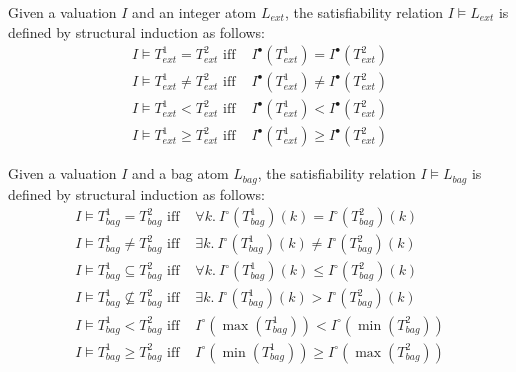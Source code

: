Given a valuation $I$ and an integer atom $L_{ext}$, the satisfiability relation $I \models L_{ext}$ is defined by structural induction as follows:
\begin{align*}
I \models T^1_{ext}=T^2_{ext} \mbox{ iff }& I^{\bullet}(T^1_{ext}) = I^{\bullet}(T^2_{ext}) \\
I \models T^1_{ext}\ne T^2_{ext} \mbox{ iff }& I^{\bullet}(T^1_{ext}) \ne I^{\bullet}(T^2_{ext}) \\
I \models T^1_{ext} < T^2_{ext} \mbox{ iff }& I^{\bullet}(T^1_{ext}) < I^{\bullet}(T^2_{ext}) \\
I \models T^1_{ext}\ge T^2_{ext} \mbox{ iff }& I^{\bullet}(T^1_{ext}) \ge I^{\bullet}(T^2_{ext})
\end{align*}

Given a valuation $I$ and a bag atom $L_{bag}$, the satisfiability relation $I \models L_{bag}$ is defined by structural induction as follows:
\begin{align*}
I \models T^1_{bag} = T^2_{bag} \mbox{ iff }& \forall k.~I^\circ(T^1_{bag})(k) = I^\circ(T^2_{bag})(k) \\
I \models T^1_{bag} \neq T^2_{bag} \mbox{ iff }& \exists k.~I^\circ(T^1_{bag})(k) \neq I^\circ(T^2_{bag})(k) \\
I \models T^1_{bag} \subseteq T^2_{bag} \mbox{ iff }& \forall k.~I^\circ(T^1_{bag})(k) \leq I^\circ(T^2_{bag})(k) \\
I \models T^1_{bag} \nsubseteq T^2_{bag} \mbox{ iff }& \exists k.~I^\circ(T^1_{bag})(k) > I^\circ(T^2_{bag})(k) \\
I \models T^1_{bag} < T^2_{bag} \mbox{ iff }& I^\circ(\max(T^1_{bag})) < I^\circ(\min(T^2_{bag})) \\
I \models T^1_{bag} \ge T^2_{bag} \mbox{ iff }& I^\circ(\min(T^1_{bag})) \ge I^\circ(\max(T^2_{bag}))
\end{align*}

